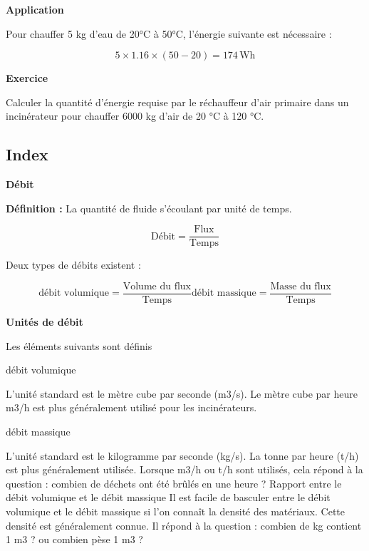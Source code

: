 \textbf{Application}

\vspace{0.3cm}
Pour chauffer 5 kg d'eau de 20°C à 50°C, l'énergie suivante est nécessaire :

\begin{equation}
    5 \times 1.16 \times (50 - 20) = 174 \, \text{Wh}
\end{equation}
			
\textbf{Exercice}
\vspace{0.3cm}

Calculer la quantité d'énergie requise par le réchauffeur d'air primaire dans un incinérateur pour chauffer 6000 kg d'air de 20 °C à 120 °C.


\subsection{Index}

\textbf{Débit}

\textbf{Définition :} La quantité de fluide s'écoulant par unité de temps.

\begin{equation}
\text{Débit}=\frac{\text{Flux}}{\text{Temps}}
\end{equation}
  

Deux types de débits existent :

\begin{equation}
    \text{débit volumique} = \frac{\text{Volume du flux}}{\text{Temps}} 
	\text{débit massique} = \frac{\text{Masse du flux}}{\text{Temps}}  	
\end{equation}


\textbf{Unités de débit}

\vspace{0.3cm}

Les éléments suivants sont définis

\vspace{0.3cm}
débit volumique
\vspace{0.3cm}

L'unité standard est le mètre cube par seconde (m3/s). 
Le mètre cube par heure m3/h est plus généralement utilisé pour les incinérateurs.

\vspace{0.3cm}
débit massique
\vspace{0.3cm}

L'unité standard est le kilogramme par seconde (kg/s).
La tonne par heure (t/h) est plus généralement utilisée. 
\vspace{0.3cm}
Lorsque m3/h ou t/h sont utilisés, cela répond à la question : combien de déchets ont été brûlés en une heure ?
\vspace{0.3cm}
Rapport entre le débit volumique et le débit massique
Il est facile de basculer entre le débit volumique et le débit massique si l'on connaît la densité des matériaux. Cette densité est généralement connue.
Il répond à la question : combien de kg contient 1 m3 ? ou combien pèse 1 m3 ?

